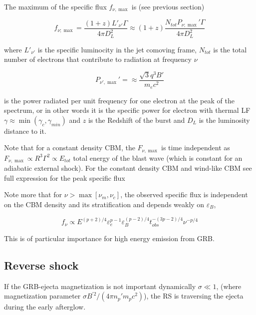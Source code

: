 The maximum of the specific flux $f_{\nu,\max}$ is (see previous section)

\begin{equation}
f_{\nu;\max} = \frac{(1+z)L'_{\nu'}\Gamma}{4\pi D_L^2} \approx (1+z)\frac{N_{tot}P_{\nu;\max}' \Gamma}{4\pi D_{L}^2}
\end{equation}

where $L'_{\nu'}$ is the specific luminocity in the jet comoving frame, $N_{tot}$ is the total number of electrons that contribute to radiation at frequency $\nu$

\begin{equation}
P_{\nu',\max}' = \approx \frac{\sqrt{3} q^3 B'}{m_e c^2}
\end{equation}

is the power radiated per unit frequency for one electron at the peak of the spectrum, or in other words it is the specific power for electron with thermal \ac{LF} $\gamma\approx\min(\gamma_c,\gamma_{min})$ and $z$ is the Redshift of the burst and $D_L$ is the luminosity distance to it.

Note that for a constant density \ac{CBM}, the $F_{\nu,\max}$ is time independent as $F_{\nu,\max}\propto R^3\Gamma^2\propto E_{tot}$ total energy of the blast wave (which is constant for an adiabatic external shock). For the constant density \ac{CBM} and wind-like \ac{CBM} see full expression for the peak specific flux \citep{Granot:2001ge,Yost:2003mw} 

Note more that for $\nu>\max[\nu_m,\nu_c]$, the observed specific flux \citep{Kumar:1999eu,Freedman:1999mp} is independent on the \ac{CBM} density and its stratification and depends weakly on $\varepsilon_B$, 

\begin{equation}
f_{\nu} \propto E^{(p+2)/4} \varepsilon_e^{p-1}\varepsilon_B^{(p-2)/4}t_{obs}^{-(3p-2)/4}\nu^{-p/4}
\end{equation}

This is of particular importance for high energy emission from \ac{GRB}.



\subsection{Reverse shock}

If the \ac{GRB}-ejecta magnetization is not important dynamically $\sigma \ll 1$, (where magnetization parameter $\sigma B^{'2}/(4\pi n_p' m_p c^2)$), the \ac{RS} is traversing the ejecta during the early afterglow. 

